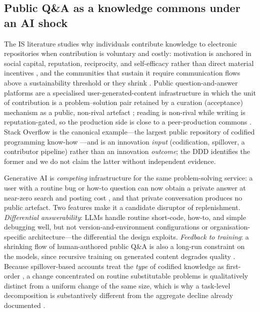 \subsection{Public Q\&A as a knowledge commons under an AI
shock}\label{ssec:theory_kc_online}\label{ssec:theory_qa_dss}\label{ssec:theory_openinnov}

The IS literature studies why individuals contribute knowledge
to electronic repositories when contribution is voluntary and
costly: motivation is anchored in social capital, reputation,
reciprocity, and self-efficacy rather than direct material
incentives \citep{wasko2005faraj,kankanhalli2005contributing},
and the communities that sustain it require communication flows
above a sustainability threshold or they shrink
\citep{butler2001membership,faraj2011knowledge}. Public
question-and-answer platforms are a specialised
user-generated-content infrastructure in which the unit of
contribution is a problem--solution pair retained by a curation
(acceptance) mechanism as a public, non-rival artefact
\citep{goes2014popularity,temizkankumar2024dss}; reading is
non-rival while writing is reputation-gated, so the production
side is close to a peer-production commons
\citep{benkler2002coase,frischmann2012infrastructure}. Stack
Overflow is the canonical example---the largest public
repository of codified programming know-how
\citep{wachs2022geography}---and is an innovation \emph{input}
(codification, spillover, a contributor pipeline) rather than an
innovation \emph{outcome}; the DDD identifies the former and we
do not claim the latter without independent evidence.

Generative AI is \emph{competing} infrastructure for the same
problem-solving service: a user with a routine bug or how-to
question can now obtain a private answer at near-zero search and
posting cost \citep{leonardi2011affordances,eloundou2024gpts},
and that private conversation produces no public artefact. Two
features make it a candidate disruptor of replenishment.
\emph{Differential answerability}: LLMs handle routine
short-code, how-to, and simple debugging well, but not
version-and-environment configurations or organisation-specific
architecture---the differential the design exploits. \emph{Feedback
to training}: a shrinking flow of human-authored public Q\&A is
also a long-run constraint on the models, since recursive
training on generated content degrades quality
\citep{shumailov2024curse}. Because spillover-based accounts
treat the \emph{type} of codified knowledge as first-order
\citep{cohenlevinthal1990absorptive,jaffe1993geographic}, a
change concentrated on routine substitutable problems is
qualitatively distinct from a uniform change of the same size,
which is why a task-level decomposition is substantively
different from the aggregate decline already documented
\citep{burtch2024chatgpt,delriochanona2024large}.

